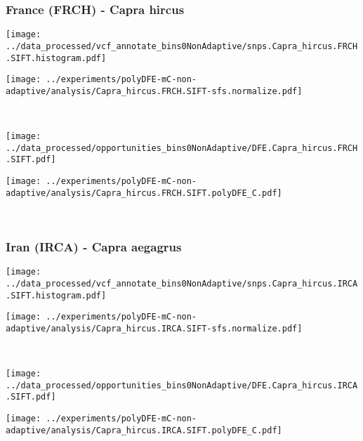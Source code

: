 \subsubsection{France (FRCH) - Capra hircus}

\begin{minipage}{0.49\linewidth}
    \texttt{[image: ../data\_processed/vcf\_annotate\_bins0NonAdaptive/snps.Capra\_hircus.FRCH.SIFT.histogram.pdf]}
\end{minipage}
\begin{minipage}{0.49\linewidth}
    \texttt{[image: ../experiments/polyDFE-mC-non-adaptive/analysis/Capra\_hircus.FRCH.SIFT-sfs.normalize.pdf]}
\end{minipage}
\\
\begin{minipage}{0.49\linewidth}
    \texttt{[image: ../data\_processed/opportunities\_bins0NonAdaptive/DFE.Capra\_hircus.FRCH.SIFT.pdf]}
\end{minipage}
\begin{minipage}{0.49\linewidth}
    \texttt{[image: ../experiments/polyDFE-mC-non-adaptive/analysis/Capra\_hircus.FRCH.SIFT.polyDFE\_C.pdf]}
\end{minipage}
\\

\subsubsection{Iran (IRCA) - Capra aegagrus}

\begin{minipage}{0.49\linewidth}
    \texttt{[image: ../data\_processed/vcf\_annotate\_bins0NonAdaptive/snps.Capra\_hircus.IRCA.SIFT.histogram.pdf]}
\end{minipage}
\begin{minipage}{0.49\linewidth}
    \texttt{[image: ../experiments/polyDFE-mC-non-adaptive/analysis/Capra\_hircus.IRCA.SIFT-sfs.normalize.pdf]}
\end{minipage}
\\
\begin{minipage}{0.49\linewidth}
    \texttt{[image: ../data\_processed/opportunities\_bins0NonAdaptive/DFE.Capra\_hircus.IRCA.SIFT.pdf]}
\end{minipage}
\begin{minipage}{0.49\linewidth}
    \texttt{[image: ../experiments/polyDFE-mC-non-adaptive/analysis/Capra\_hircus.IRCA.SIFT.polyDFE\_C.pdf]}
\end{minipage}
\\

